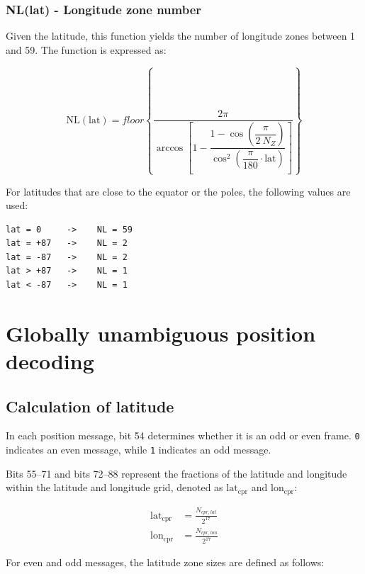 \subsubsection{NL(lat) - Longitude zone number}

Given the latitude, this function yields the number of longitude zones between 1 and 59. The function is expressed as:

\begin{equation}
  \mathrm{NL}(\mathrm{lat}) = floor \left\{ \dfrac{2 \pi}{\arccos \left[ 1 - \dfrac{1-\cos \left( \dfrac{\pi}{2~N_Z} \right)}{\cos^2\left(\dfrac{\pi}{180} \cdot \mathrm{lat} \right)} \right] } \right\}
\end{equation}

For latitudes that are close to the equator or the poles, the following values are used:

\begin{verbatim}
lat = 0     ->    NL = 59
lat = +87   ->    NL = 2
lat = -87   ->    NL = 2
lat > +87   ->    NL = 1
lat < -87   ->    NL = 1
\end{verbatim}


\section{Globally unambiguous position decoding} 

\subsection{Calculation of latitude} \label{sec:cpr_airborne_global_lat}

In each position message, bit 54 determines whether it is an odd or even frame. \texttt{0} indicates an even message, while \texttt{1} indicates an odd message.

Bits 55--71 and bits 72--88 represent the fractions of the latitude and longitude within the latitude and longitude grid, denoted as $\mathrm{lat}_\mathrm{cpr}$ and $\mathrm{lon}_\mathrm{cpr}$:

\begin{equation}
  \begin{split}
      \mathrm{lat}_\mathrm{cpr} &= \frac{N_{cpr,lat}}{2^{17}} \\
    \mathrm{lon}_\mathrm{cpr} &= \frac{N_{cpr,lon}}{2^{17}}
  \end{split}
\end{equation}


For even and odd messages, the latitude zone sizes are defined as follows:


